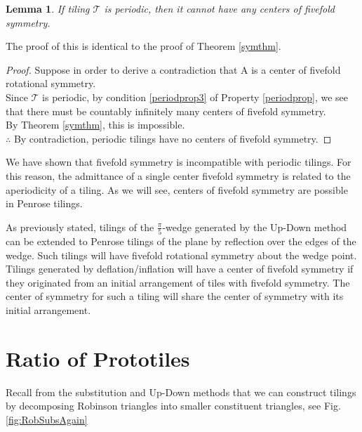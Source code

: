 \documentclass[
  oneside,
  11pt, a4paper,
  footinclude=true,
  headinclude=true,
  cleardoublepage=empty
]{scrbook}
\newtheorem{mylem}{Lemma}
\begin{document}
\begin{mylem}
If tiling $\mathcal{T}$ is periodic, then it cannot have any centers of fivefold symmetry.
\end{mylem}
The proof of this is identical to the proof of Theorem \ref{symthm}.
\begin{proof}
Suppose in order to derive a contradiction that A is a center of fivefold rotational symmetry.\\
Since $\mathcal{T}$ is periodic, by condition \ref{periodprop3} of Property \ref{periodprop}, we see that there must be countably infinitely many centers of fivefold symmetry.\\
By Theorem \ref{symthm}, this is impossible.\\
$\therefore$ By contradiction, periodic tilings have no centers of fivefold symmetry.
\end{proof}

We have shown that fivefold symmetry is incompatible with periodic tilings. For this reason, the admittance of a single center fivefold symmetry is related to the aperiodicity of a tiling. As we will see, centers of fivefold symmetry are possible in Penrose tilings. 

As previously stated, tilings of the $\frac{\pi}{5}$-wedge generated by the Up-Down method can be extended to Penrose tilings of the plane by reflection over the edges of the wedge. Such tilings will have fivefold rotational symmetry about the wedge point. Tilings generated by deflation/inflation will have a center of fivefold symmetry if they originated from an initial arrangement of tiles with fivefold symmetry. The center of symmetry for such a tiling will share the center of symmetry with its initial arrangement.  





\section{Ratio of Prototiles}
Recall from the substitution and Up-Down methods that we can construct tilings by decomposing Robinson triangles into smaller constituent triangles, see Fig.\ref{fig:RobSubsAgain}
\end{document}
